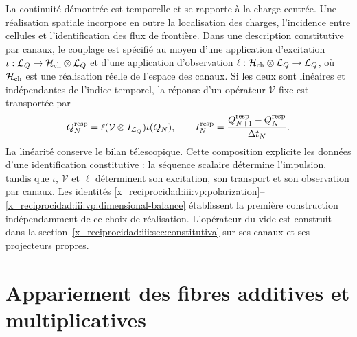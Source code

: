 La continuité démontrée est temporelle et se rapporte à la charge centrée. Une réalisation spatiale incorpore en outre la localisation des charges, l'incidence entre cellules et l'identification des flux de frontière. Dans une description constitutive par canaux, le couplage est spécifié au moyen d'une application d'excitation $\iota:\mathcal L_Q\to\mathcal H_{\rm ch}\otimes\mathcal L_Q$ et d'une application d'observation $\ell:\mathcal H_{\rm ch}\otimes\mathcal L_Q\to\mathcal L_Q$, où $\mathcal H_{\rm ch}$ est une réalisation réelle de l'espace des canaux. Si les deux sont linéaires et indépendantes de l'indice temporel, la réponse d'un opérateur $\mathcal V$ fixe est transportée par
\[
 Q_N^{\rm resp}=\ell(\mathcal V\otimes I_{\mathcal L_Q})\iota(Q_N),
 \qquad
 I_N^{\rm resp}=\frac{Q_{N+1}^{\rm resp}-Q_N^{\rm resp}}{\Delta t_N}.
\]
La linéarité conserve le bilan télescopique. Cette composition
explicite les données d’une identification constitutive : la séquence
scalaire détermine l’impulsion, tandis que $\iota$, $\mathcal V$ et $\ell$
déterminent son excitation, son transport et son observation par canaux. Les
identités \eqref{x_reciprocidad:iii:vp:polarization}--\eqref{x_reciprocidad:iii:vp:dimensional-balance}
établissent la première construction indépendamment de ce choix de
réalisation. L’opérateur du vide est construit dans la
section~\ref{x_reciprocidad:iii:sec:constitutiva} sur ses canaux et ses projecteurs propres.

\section{Appariement des fibres additives et multiplicatives}

